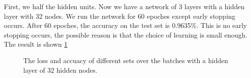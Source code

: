 \documentclass{article} %
\begin{document}
First, we half the hidden units. Now we have a network of 3 layers with a hidden layer with 32 nodes. We run the network for 60 epoches except early stopping occurs. After 60 epoches, the accuracy on the test set is 0.9635\%. This is no early stopping occurs, the possible reason is that the choice of learning is small enough. The result is shown \ref{Figure: 32}

\begin{figure} [!htbp]
	
	\caption{The loss and accuacy of different sets over the batches with a hidden layer of 32 hidden nodes. }  
	\label{Figure: 32}
\end{figure}
\end{document}
